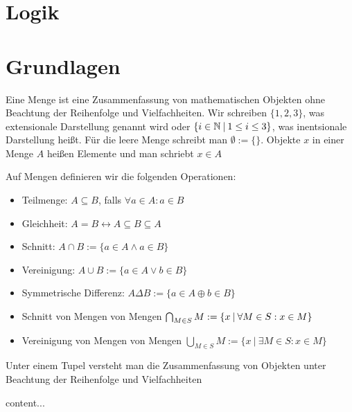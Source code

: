 \section{Logik}

\section{Grundlagen}

\begin{definition}[Menge]
	Eine Menge ist eine Zusammenfassung von mathematischen Objekten ohne Beachtung der Reihenfolge und Vielfachheiten. Wir schreiben $\{1, 2, 3\}$, was extensionale Darstellung genannt wird oder $\{i \in \mathbb{N} \medspace | \medspace 1 \leq i \leq 3  \}$, was inentsionale Darstellung heißt. Für die leere Menge schreibt man $\emptyset := \{\}$. Objekte $x$ in einer Menge $A$ heißen Elemente und man schriebt $x \in A$
\end{definition}
\begin{definition}
	Auf Mengen definieren wir die folgenden Operationen:
	\begin{itemize}[noitemsep]
		\item Teilmenge: $A \subseteq B$, falls $\forall a \in A : a \in B$
		\item Gleichheit: $A = B \leftrightarrow A \subseteq B \subseteq A$
		\item Schnitt: $A \cap B := \{ a \in A \land a \in B\}$
		\item Vereinigung: $A \cup B := \{ a \in A \lor b \in B\}$
		\item Symmetrische Differenz: $A \Delta B := \{a \in A \oplus b \in B\}$
		\item Schnitt von Mengen von Mengen $\bigcap_{M \in S} M := \{x \medspace | \medspace \forall M \in S: x \in M\}$
		\item Vereinigung von Mengen von Mengen $\bigcup_{M \in S} M := \{x \medspace | \medspace \exists M \in S: x \in M\}$
	\end{itemize}
\end{definition}

\begin{definition}
	Unter einem Tupel versteht man die Zusammenfassung von Objekten unter Beachtung der Reihenfolge und Vielfachheiten
\end{definition}

\begin{definition}[Relationen]
	content...
\end{definition}

